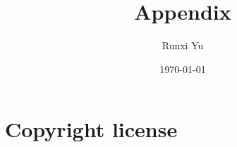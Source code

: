 \documentclass[numbers=endperiod, parskip=half-]{scrreprt}
\title{Appendix}
\author{Runxi Yu}
\date{\today}
\begin{document}
\maketitle

\tableofcontents



\chapter{Copyright license}


\end{document}
